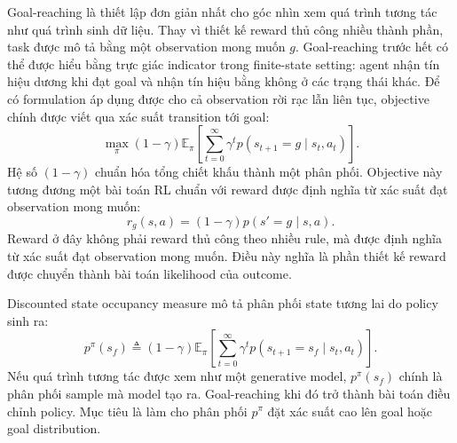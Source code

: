 Goal-reaching là thiết lập đơn giản nhất cho góc nhìn xem quá trình tương tác như quá trình sinh dữ liệu.
Thay vì thiết kế reward thủ công nhiều thành phần, task được mô tả bằng một observation mong muốn $g$.
Goal-reaching trước hết có thể được hiểu bằng trực giác indicator trong finite-state setting: agent nhận tín hiệu dương khi đạt goal và nhận tín hiệu bằng không ở các trạng thái khác.
Để có formulation áp dụng được cho cả observation rời rạc lẫn liên tục, objective chính được viết qua xác suất transition tới goal:
\begin{equation}
    \max_\pi
    (1-\gamma)
    \mathbb{E}_{\pi}
    \left[
        \sum_{t=0}^{\infty}
        \gamma^t
        p(s_{t+1}=g\mid s_t,a_t)
    \right].
    \label{eq:tv2-goal-prob}
\end{equation}
Hệ số $(1-\gamma)$ chuẩn hóa tổng chiết khấu thành một phân phối.
Objective này tương đương một bài toán RL chuẩn với reward được định nghĩa từ xác suất đạt observation mong muốn:
\begin{equation}
    r_g(s,a)
    =
    (1-\gamma)
    p(s'=g\mid s,a).
    \label{eq:tv2-goal-reward}
\end{equation}
Reward ở đây không phải reward thủ công theo nhiều rule, mà được định nghĩa từ xác suất đạt observation mong muốn.
Điều này nghĩa là phần thiết kế reward được chuyển thành bài toán likelihood của outcome.

Discounted state occupancy measure mô tả phân phối state tương lai do policy sinh ra:
\begin{equation}
    p^\pi(s_f)
    \triangleq
    (1-\gamma)
    \mathbb{E}_{\pi}
    \left[
        \sum_{t=0}^{\infty}
        \gamma^t
        p(s_{t+1}=s_f\mid s_t,a_t)
    \right].
    \label{eq:tv2-state-occupancy}
\end{equation}
Nếu quá trình tương tác được xem như một generative model, $p^\pi(s_f)$ chính là phân phối sample mà model tạo ra.
Goal-reaching khi đó trở thành bài toán điều chỉnh policy. Mục tiêu là làm cho phân phối $p^\pi$ đặt xác suất cao lên goal hoặc goal distribution.

